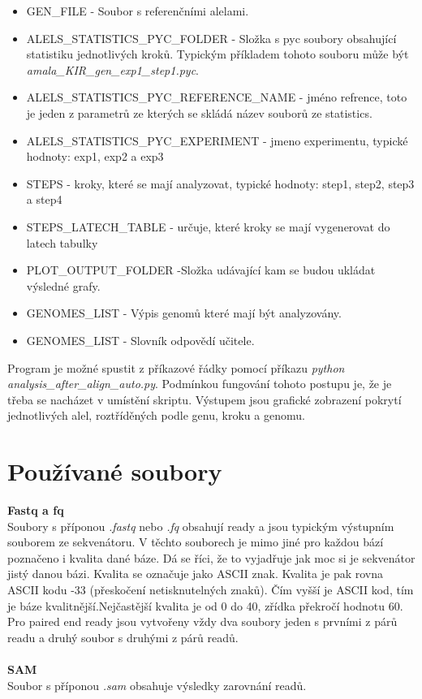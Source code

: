 \documentclass[czech,DP]{thesiskiv}
\numberwithin{equation}{section}
\begin{document}
\begin{itemize}
	\item GEN\_FILE - Soubor s referenčními alelami.
	\item ALELS\_STATISTICS\_PYC\_FOLDER - Složka s pyc soubory obsahující statistiku jednotlivých kroků. Typickým příkladem tohoto souboru může být \textit{amala\_KIR\_gen\_exp1\_step1.pyc}.
	\item ALELS\_STATISTICS\_PYC\_REFERENCE\_NAME - jméno refrence, toto je jeden z parametrů ze kterých se skládá název souborů ze statistics.
	\item ALELS\_STATISTICS\_PYC\_EXPERIMENT - jmeno experimentu, typické hodnoty: exp1, exp2 a exp3
	\item STEPS - kroky, které se mají analyzovat, typické hodnoty: step1, step2, step3 a step4
	\item STEPS\_LATECH\_TABLE  - určuje, které kroky se mají vygenerovat do latech tabulky
	\item PLOT\_OUTPUT\_FOLDER -Složka udávající kam se budou ukládat výsledné grafy.
	\item GENOMES\_LIST - Výpis genomů které mají být analyzovány.
	\item GENOMES\_LIST - Slovník odpovědí učitele.
\end{itemize}

\noindent
Program je možné spustit z příkazové řádky pomocí příkazu \textit{python analysis\_after\_align\_auto.py}. Podmínkou fungování tohoto postupu je, že je třeba se nacházet v umístění skriptu. Výstupem jsou grafické zobrazení pokrytí jednotlivých alel, roztříděných podle genu, kroku a genomu.





\section{Používané soubory}

\textbf{Fastq a fq}
\\
\noindent
Soubory s příponou \textit{.fastq} nebo \textit{.fq} obsahují ready a jsou typickým výstupním souborem ze sekvenátoru. V těchto souborech je mimo jiné pro každou bází poznačeno i kvalita dané báze. Dá se říci, že to vyjadřuje jak moc si je sekvenátor jistý danou bázi. Kvalita se označuje jako ASCII znak. Kvalita je pak rovna ASCII kodu -33 (přeskočení netisknutelných znaků). Čím vyšší je ASCII kod, tím je báze kvalitnější.Nejčastější kvalita je od 0 do 40, zřídka překročí hodnotu 60. Pro paired end ready jsou vytvořeny vždy dva soubory jeden s prvními z párů readu a druhý soubor s druhými z párů readů. 
\\
\\
\textbf{SAM}	   
\\
\noindent 
Soubor s příponou \textit{.sam} obsahuje výsledky zarovnání readů.
\end{document}
